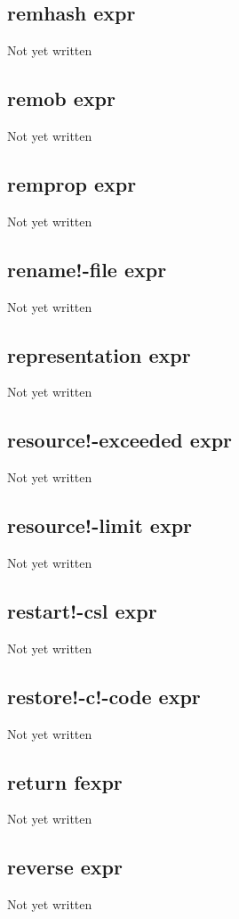 \documentclass[a4paper,11pt]{article}
\begin{document}
\subsection{\ttfamily remhash expr}
Not yet written

\subsection{\ttfamily remob expr}
Not yet written

\subsection{\ttfamily remprop expr}
Not yet written

\subsection{\ttfamily rename!-file expr}
Not yet written

\subsection{\ttfamily representation expr}
Not yet written

\subsection{\ttfamily resource!-exceeded expr}
Not yet written

\subsection{\ttfamily resource!-limit expr}
Not yet written

\subsection{\ttfamily restart!-csl expr}
Not yet written

\subsection{\ttfamily restore!-c!-code expr}
Not yet written

\subsection{\ttfamily return fexpr}
Not yet written

\subsection{\ttfamily reverse expr}
Not yet written
\end{document}
